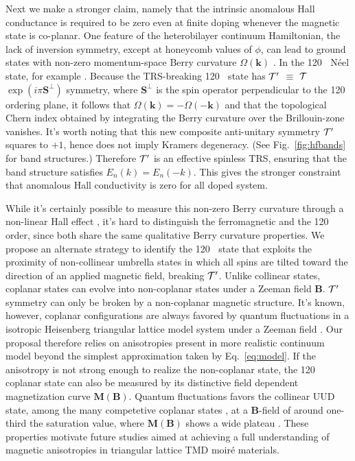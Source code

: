 \documentclass[%
 reprint,
 superscriptaddress,
 amsmath,amssymb,
 aps,
 prx,
 floatfix,
]{revtex4-2}
\newcommand{\<}{\langle}
\renewcommand{\>}{\rangle}
\renewcommand{\(}{\left(}
\renewcommand{\)}{\right)}
\renewcommand{\[}{\left[}
\renewcommand{\]}{\right]}
\renewcommand{\b}[1]{\mathbf{#1}} %
\DeclareMathOperator{\degree}{^{\circ}}
\begin{document}
Next we make a stronger claim, namely that the intrinsic anomalous Hall conductance is required to be zero even at finite doping 
whenever the magnetic state is co-planar.  
One feature of the heterobilayer continuum Hamiltonian, the lack of inversion symmetry, except at honeycomb values of $\phi$, can lead
to ground states with non-zero momentum-space Berry curvature $\Omega(\bm{k})$ \cite{xiaoBerryrmp2010}. 
In the 120$\degree$ N\'eel state, for example \cite{HuaChenPhysRevLett.112.017205}. 
Because the TRS-breaking 120$\degree$ state has  
$\cal{T}'$ $\equiv$ $\cal{T}$ $\exp (i \pi \b{S}^{\perp})$ symmetry, where $\b{S}^{\perp}$ is the spin operator perpendicular to the 120$\degree$ ordering plane, it follows that  
$\Omega(\bm{k})=-\Omega(-\bm{k})$ and that the topological Chern index obtained by integrating the Berry curvature over the Brillouin-zone vanishes. It's worth noting that this new composite anti-unitary symmetry $\cal{T}'$ squares to $+1$, hence does not imply Kramers degeneracy. (See Fig.~\ref{fig:hfbands} for band structures.) Therefore $\cal{T}'$ is an effective spinless TRS, ensuring that the band structure satisfies 
$E_n(k) = E_n(-k)$. This gives the stronger constraint that anomalous Hall conductivity is zero for all doped system.   

While it's certainly possible to measure this non-zero Berry curvature through a non-linear Hall effect \cite{SodemannNLHE2015}, it's hard to distinguish the ferromagnetic and the 120$\degree$ order, since both share the same qualitative Berry curvature properties.
We propose an alternate strategy to identify the 120$\degree$ state that exploits the proximity of non-collinear 
umbrella \cite{starykh2015unusual} states in which all spins are tilted toward the direction of an applied magnetic field,
breaking $\cal{T}'$. Unlike collinear states, coplanar states can evolve into non-coplanar states under a Zeeman field $\b B$.
$\cal{T}'$ symmetry can only be broken by a non-coplanar magnetic structure. 
It's known, however, coplanar configurations are always favored by quantum fluctuations in a isotropic 
Heisenberg triangular lattice model system under a Zeeman field \cite{chubukov2017j1j2B,farnell2019non}. 
Our proposal therefore relies on anisotropies present in more realistic continuum model beyond the simplest approximation taken by Eq.~\eqref{eq:model}.  If the anisotropy is not strong enough to realize the non-coplanar state, 
the 120$\degree$ coplanar state can also be measured by its distinctive field dependent magnetization curve $\b M(\b B)$. 
Quantum fluctuations favors the collinear UUD state, among the many competetive coplanar states \cite{chubukov2017j1j2B},
at a $\b B$-field of around one-third the saturation value, where $\b M(\b B)$ shows a wide plateau \cite{starykh2015unusual}.
These properties motivate future studies aimed at achieving a full understanding of magnetic anisotropies in 
triangular lattice TMD moir\'e materials. 
\end{document}
